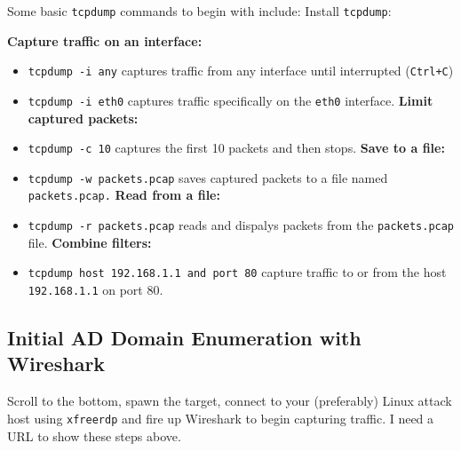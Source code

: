 \begin{notebox}
Some basic \texttt{tcpdump} commands to begin with include:
Install \texttt{tcpdump}:
\textbf{Capture traffic on an interface:}
\begin{itemize}
    \item \verb|tcpdump -i any| captures traffic from any interface until interrupted (\texttt{Ctrl+C})
    \item \verb|tcpdump -i eth0| captures traffic specifically on the \texttt{eth0} interface.
\textbf{Limit captured packets:}
\item \verb|tcpdump -c 10| captures the first 10 packets and then stops.
\textbf{Save to a file:}
\item \verb|tcpdump -w packets.pcap| saves captured packets to a file named \texttt{packets.pcap.}
\textbf{Read from a file:}
\item \verb|tcpdump -r packets.pcap| reads and dispalys packets from the \texttt{packets.pcap} file.
\textbf{Combine filters:}
\item \verb|tcpdump host 192.168.1.1 and port 80| capture traffic to or from the host \texttt{192.168.1.1} on port 80.
\end{itemize}
\end{notebox}

\subsection{Initial AD Domain Enumeration with Wireshark}
Scroll to the bottom, spawn the target, connect to your (preferably) Linux attack host using \texttt{xfreerdp} and fire up Wireshark to begin capturing traffic.
I need a URL to show these steps above.

